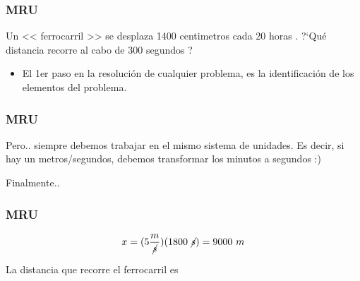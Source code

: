 \documentclass{beamer}
\begin{document}
\begin{frame}
\frametitle{MRU}

Un << ferrocarril >> { se desplaza } { 1400 centimetros } cada { 20 horas }. ?`Qu\'e { distancia } recorre al cabo de { 300 segundos ?} %


\begin{itemize}
\item El 1er paso en la resoluci\'on de cualquier problema, es la
identificaci\'on de los elementos del problema.
\end{itemize}


\end{frame}

\begin{frame}
\frametitle{MRU}
{\huge \xmru}

Pero.. siempre debemos trabajar en el mismo sistema de unidades.
Es decir, si hay un metros/segundos,
debemos transformar los 
minutos a segundos :)

\begin{center}
\end{center}

Finalmente..
\end{frame}

\begin{frame}
\frametitle{MRU}
{\large
\begin{equation}
x=
(5\frac{m}{\cancel{s}})
(1800~\cancel{s})=
9000~m
\end{equation}}

La distancia que recorre el ferrocarril es
\end{frame}
\end{document}
